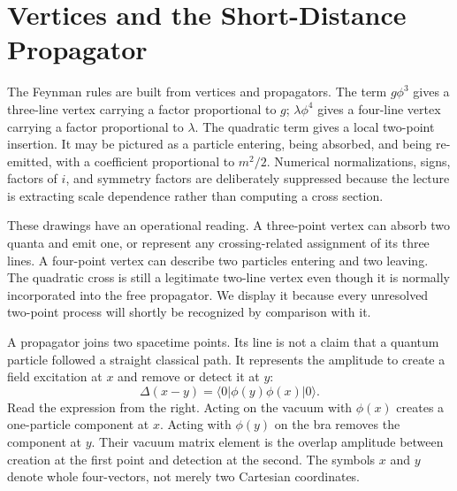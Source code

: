 \begin{classroomqa}
\end{classroomqa}

\section{Vertices and the Short-Distance Propagator}

The Feynman rules are built from vertices and propagators. The term
\(g\phi^3\) gives a three-line vertex carrying a factor proportional to
\(g\); \(\lambda\phi^4\) gives a four-line vertex carrying a factor
proportional to \(\lambda\). The quadratic term gives a local two-point
insertion. It may be pictured as a particle entering, being absorbed, and
being re-emitted, with a coefficient proportional to \(m^2/2\). Numerical
normalizations, signs, factors of \(i\), and symmetry factors are deliberately
suppressed because the lecture is extracting scale dependence rather than
computing a cross section.

These drawings have an operational reading. A three-point vertex can absorb
two quanta and emit one, or represent any crossing-related assignment of its
three lines. A four-point vertex can describe two particles entering and two
leaving. The quadratic cross is still a legitimate two-line vertex even
though it is normally incorporated into the free propagator. We display it
because every unresolved two-point process will shortly be recognized by
comparison with it.

A propagator joins two spacetime points. Its line is not a claim that a
quantum particle followed a straight classical path. It represents the
amplitude to create a field excitation at \(x\) and remove or detect it at
\(y\):
\begin{equation}
\Delta(x-y)=\langle0|\phi(y)\phi(x)|0\rangle.
\label{eq:position-propagator}
\end{equation}
Read the expression from the right. Acting on the vacuum with \(\phi(x)\)
creates a one-particle component at \(x\). Acting with \(\phi(y)\) on the bra
removes the component at \(y\). Their vacuum matrix element is the overlap
amplitude between creation at the first point and detection at the second.
The symbols \(x\) and \(y\) denote whole four-vectors, not merely two
Cartesian coordinates.

